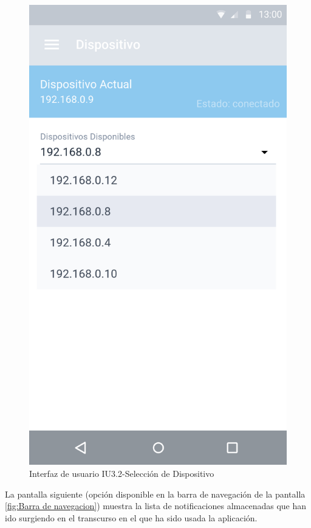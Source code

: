 \begin{figure}[H]
	\centering
	\includegraphics[scale=0.70]{Capitulo4/software/submodulos/images/opciones_disp.png}
	\caption{Interfaz de usuario IU3.2-Selección de Dispositivo}
	\label{fig:Seleccion de Disposotivo}
\end{figure}

La pantalla siguiente (opción disponible en la barra de navegación de la pantalla \ref{fig:Barra de navegacion}) muestra la lista de notificaciones almacenadas que han ido surgiendo en el transcurso en el que ha sido usada la aplicación.

